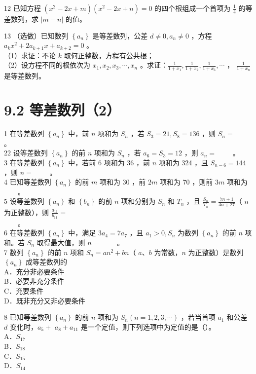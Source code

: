 \documentclass[10pt]{article}
\begin{document}
12 已知方程 \(\left(x^{2}-2 x+m\right)\left(x^{2}-2 x+n\right)=0\) 的四个根组成一个首项为 \(\frac{1}{4}\) 的等差数列，求 \(|m-n|\) 的值。

13 （选做）已知数列 \(\left\{a_{n}\right\}\) 是等差数列，公差 \(d \neq 0, a_{n} \neq 0\) ，方程 \(a_{k} x^{2}+2 a_{k+1} x+a_{k+2}=0\) 。\\
（1）求证：不论 \(k\) 取何正整数，方程有公共根；\\
（2）设方程不同的根依次为 \(x_{1}, x_{2}, x_{3}, \cdots, x_{n}\) 。求证：\(\frac{1}{1+x_{1}}, \frac{1}{1+x_{2}}, \frac{1}{1+x_{3}}, \cdots\) ， \(\frac{1}{1+x_{n}}\) 是等差数列。

\section*{9.2 等差数列（2）}
1 在等差数列 \(\left\{a_{n}\right\}\) 中，前 \(n\) 项和为 \(S_{n}\) ，若 \(S_{3}=21, S_{8}=136\) ，则 \(S_{n}=\) \(\qquad\)。\\
22 设等差数列 \(\left\{a_{n}\right\}\) 的前 \(n\) 项和为 \(S_{n}\) ，若 \(a_{6}=S_{3}=12\) ，则 \(a_{n}=\) \(\qquad\)。\\
3 在等差数列 \(\left\{a_{n}\right\}\) 中，若前 6 项和为 36 ，前 \(n\) 项和为 324 ，且 \(S_{n-6}=144\) ，则 \(n=\) \(\qquad\)。\\
4 已知等差数列 \(\left\{a_{n}\right\}\) 的前 \(m\) 项和为 30 ，前 \(2 m\) 项和为 70 ，则前 \(3 m\) 项和为 \(\qquad\)。\\
5 设等差数列 \(\left\{a_{n}\right\}\) 和 \(\left\{b_{n}\right\}\) 的前 \(n\) 项和分别为 \(S_{n}\) 和 \(T_{n}\) ，且 \(\frac{S_{n}}{T_{n}}=\frac{7 n+1}{4 n+27}\)（ \(n\) 为正整数），则 \(\frac{a_{11}}{b_{11}}=\)\\
\(\qquad\)。\\
6 在等差数列 \(\left\{a_{n}\right\}\) 中，满足 \(3 a_{4}=7 a_{7}\) ，且 \(a_{1}>0, S_{n}\) 为数列 \(\left\{a_{n}\right\}\) 的前 \(n\) 项和。若 \(S_{n}\) 取得最大值，则 \(n=\) \(\qquad\)。\\
7 数列 \(\left\{a_{n}\right\}\) 的前 \(n\) 项和 \(S_{n}=a n^{2}+b n\)（ \(a 、 b\) 为常数，\(n\) 为正整数）是数列 \(\left\{a_{n}\right\}\) 成等差数列的\\
A．充分非必要条件\\
B．必要非充分条件\\
C．充要条件\\
D．既非充分又非必要条件

8 已知等差数列 \(\left\{a_{n}\right\}\) 的前 \(n\) 项和为 \(S_{n}(n=1,2,3, \cdots)\) ，若当首项 \(a_{1}\) 和公差 \(d\) 变化时，\(a_{5}+\) \(a_{8}+a_{11}\) 是一个定值，则下列选项中为定值的是（）。\\
A．\(S_{17}\)\\
B．\(S_{18}\)\\
C．\(S_{15}\)\\
D．\(S_{14}\)
\end{document}
